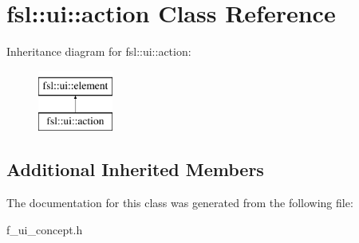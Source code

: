 \hypertarget{classfsl_1_1ui_1_1action}{}\section{fsl\+::ui\+::action Class Reference}
\label{classfsl_1_1ui_1_1action}
Inheritance diagram for fsl\+::ui\+::action\+:\begin{figure}[H]
\begin{center}
\leavevmode
\includegraphics[height=2.000000cm]{classfsl_1_1ui_1_1action}
\end{center}
\end{figure}
\subsection*{Additional Inherited Members}


The documentation for this class was generated from the following file\+:\begin{DoxyCompactItemize}
\item 
f\+\_\+ui\+\_\+concept.\+h\end{DoxyCompactItemize}
